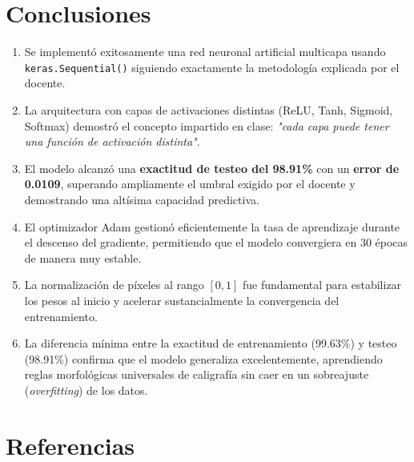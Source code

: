 \documentclass[12pt,a4paper]{article}
\begin{document}

\section{Conclusiones}

\begin{enumerate}
    \item Se implementó exitosamente una red neuronal artificial multicapa usando \texttt{keras.Sequential()} siguiendo exactamente la metodología explicada por el docente.

    \item La arquitectura con capas de activaciones distintas (ReLU, Tanh, Sigmoid, Softmax) demostró el concepto impartido en clase: \textit{"cada capa puede tener una función de activación distinta"}.

    \item El modelo alcanzó una \textbf{exactitud de testeo del 98.91\%} con un \textbf{error de 0.0109}, superando ampliamente el umbral exigido por el docente y demostrando una altísima capacidad predictiva.

    \item El optimizador Adam gestionó eficientemente la tasa de aprendizaje durante el descenso del gradiente, permitiendo que el modelo convergiera en 30 épocas de manera muy estable.

    \item La normalización de píxeles al rango $[0, 1]$ fue fundamental para estabilizar los pesos al inicio y acelerar sustancialmente la convergencia del entrenamiento.

    \item La diferencia mínima entre la exactitud de entrenamiento (99.63\%) y testeo (98.91\%) confirma que el modelo generaliza excelentemente, aprendiendo reglas morfológicas universales de caligrafía sin caer en un sobreajuste (\textit{overfitting}) de los datos.
\end{enumerate}

\section{Referencias}
\end{document}
